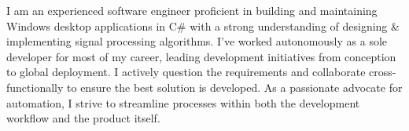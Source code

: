 \begin{justify}
I am an experienced software engineer proficient in building and maintaining Windows desktop applications in C\# with a strong understanding of designing \& implementing signal processing algorithms. I’ve worked autonomously as a sole developer for most of my career, leading development initiatives from conception to global deployment. I actively question the requirements and collaborate cross-functionally to ensure the best solution is developed. As a passionate advocate for automation, I strive to streamline processes within both the development workflow and the product itself.
\end{justify}